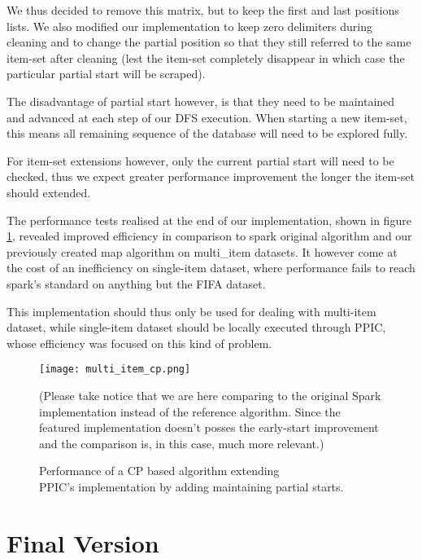\documentclass{eplmastersthesis}
\begin{document}
We thus decided to remove this matrix, but to keep the first and last positions lists.
We also modified our implementation to keep zero delimiters during cleaning and to change the partial position so that they still referred to the same item-set after cleaning (lest the item-set completely disappear in which case the particular partial start will be scraped). \newline

The disadvantage of partial start however, is that they need to be maintained and advanced at each step of our DFS execution. When starting a new item-set, this means all remaining sequence of the database will need to be explored fully. \newline

For item-set extensions however, only the current partial start will need to be checked, thus we expect greater performance improvement the longer the item-set should extended. \newline

The performance tests realised at the end of our implementation, shown in figure \ref{fig:multi_array}, revealed improved efficiency in comparison to spark original algorithm and our previously created map algorithm on multi\_item datasets. It however come at the cost of an inefficiency on single-item dataset, where performance fails to reach spark's standard on anything but the FIFA dataset. \newline

This implementation should thus only be used for dealing with multi-item dataset, while single-item dataset should be locally executed through PPIC, whose efficiency was focused on this kind of problem.

\begin{figure}[h]
  \centering
  \texttt{[image: multi\_item\_cp.png]}
  \caption[PPIC with partial starts]{
  		Performance of a CP based algorithm extending \\
  		PPIC's implementation by adding maintaining partial starts.
  	\endtabular
  }
  \label{fig:multi_array}
  (Please take notice that we are here comparing to the original Spark implementation instead of the reference algorithm. Since the featured implementation doesn't posses the early-start improvement and the comparison is, in this case, much more relevant.)
\end{figure}

\section{Final Version}
\end{document}

